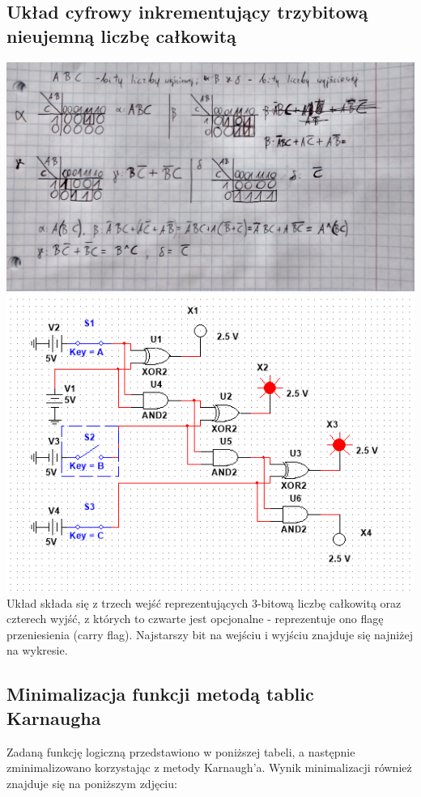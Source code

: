 \documentclass[12pt,a4paper]{article}
\begin{document}
\subsection{Układ cyfrowy inkrementujący trzybitową nieujemną liczbę całkowitą}
\includegraphics[width=\textwidth]{7_bit_incr_karnaugh}
\includegraphics[width=\textwidth]{2a}\\
Układ składa się z trzech wejść reprezentujących 3-bitową liczbę całkowitą oraz czterech wyjść, z których to czwarte jest opcjonalne - reprezentuje ono flagę przeniesienia (carry flag). Najstarszy bit na wejściu i wyjściu znajduje się najniżej na wykresie.

\newpage
\subsection{Minimalizacja funkcji metodą tablic Karnaugha}
Zadaną funkcję logiczną przedstawiono w poniższej tabeli, a następnie zminimalizowano korzystając z metody Karnaugh'a. Wynik minimalizacji również znajduje się na poniższym zdjęciu:
\end{document}
